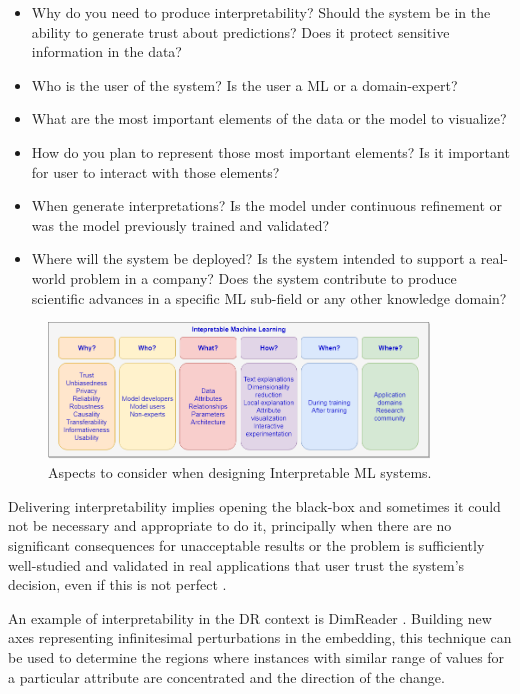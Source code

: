 \begin{itemize}
    \item Why do you need to produce interpretability? Should the system be in the ability to generate trust about predictions? Does it protect sensitive information in the data?
    \item Who is the user of the system? Is the user a ML or a domain-expert?
    \item What are the most important elements of the data or the model to visualize?
    \item How do you plan to represent those most important elements? Is it important for user to interact with those elements?
    \item When generate interpretations? Is the model under continuous refinement  or was the model previously trained and validated?
    \item Where will the system be deployed? Is the system intended to support a real-world problem in a company? Does the system contribute to produce scientific advances in a specific ML sub-field or any other knowledge domain?  
\end{itemize}

\begin{figure}[ht]
 \centering
 \includegraphics[width=0.9\textwidth]{InterpretableML.png}
 \caption{Aspects to consider when designing Interpretable ML systems.}
 \label{fig:interpretableML}
\end{figure}

Delivering interpretability implies opening the black-box and sometimes it could not be necessary and appropriate to do it, principally when there are no significant consequences for unacceptable results or the problem is sufficiently well-studied and validated in real applications that user trust the system’s decision, even if this is not perfect \cite{Doshi-Velez2017c}.

An example of interpretability in the DR context is DimReader \cite{Faust2019DimReader:Projections}. Building new axes representing infinitesimal perturbations in the embedding, this technique can be used to determine the regions where instances with similar range of values for a particular attribute are concentrated and the direction of the change.     

